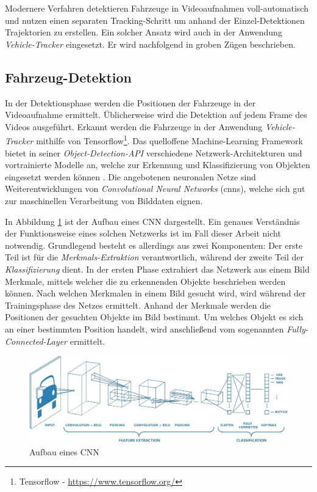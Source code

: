 Modernere Verfahren detektieren Fahrzeuge in Videoaufnahmen voll-automatisch und nutzen einen separaten
Tracking-Schritt um anhand der Einzel-Detektionen Trajektorien zu erstellen. Ein solcher Ansatz wird auch in der Anwendung
\textit{Vehicle-Tracker} eingesetzt. Er wird nachfolgend in groben Zügen beschrieben.

\subsection{Fahrzeug-Detektion}

In der Detektionsphase werden die Positionen der Fahrzeuge in der Videoaufnahme ermittelt.
Üblicherweise wird die Detektion auf jedem Frame des Videos ausgeführt.
Erkannt werden die Fahrzeuge in der Anwendung \textit{Vehicle-Tracker} mithilfe von Tensorflow\footnote{Tensorflow - \url{https://www.tensorflow.org/}}.
Das quelloffene Machine-Learning Framework bietet in seiner \textit{Object-Detection-API}
verschiedene Netzwerk-Architekturen und vortrainierte Modelle an, welche zur Erkennung und Klassifizierung
von Objekten eingesetzt werden können \cite[]{Huang2018}. Die angebotenen neuronalen Netze sind Weiterentwicklungen
von \textit{Convolutional Neural Networks} (\acrshort*{cnn}s), welche sich gut zur maschinellen Verarbeitung
von Bilddaten eignen.

In Abbildung \ref{fig:grund_structure_cnn} ist der Aufbau eines CNN dargestellt.
Ein genaues Verständnis der Funktionsweise eines solchen Netzwerks ist im Fall dieser Arbeit nicht notwendig.
Grundlegend besteht es allerdings aus zwei Komponenten: Der erste Teil ist für
die \textit{Merkmals-Extraktion} verantwortlich, während der zweite Teil der \textit{Klassifizierung} dient.
In der ersten Phase extrahiert das Netzwerk aus einem Bild Merkmale, mittels
welcher die zu erkennenden Objekte beschrieben werden können. Nach welchen Merkmalen in einem Bild gesucht wird,
wird während der Trainingsphase des Netzes ermittelt.
Anhand der Merkmale werden die Positionen der gesuchten Objekte im Bild bestimmt.
Um welches Objekt es sich an einer bestimmten Position handelt, wird anschließend vom sogenannten
\textit{Fully-Connected-Layer} ermittelt. \cite[]{Cornelisse2018}

\begin{figure}[H]
    \centering
    \includegraphics[width=0.95\linewidth]{resources/img/grundlagen/TrajectoryReconstruction/cnn_structure}
    \caption[Aufbau eines CNN]{Aufbau eines CNN \cite[]{PatelShyamal2017}}
    \label{fig:grund_structure_cnn}
\end{figure}

